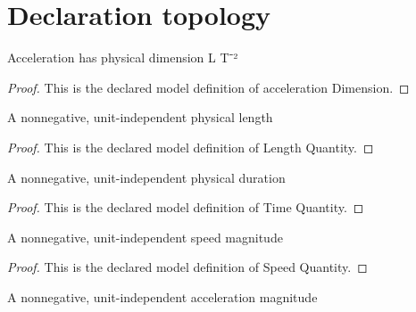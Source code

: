 \section{Declaration topology}
\begin{definition}
  \label{def:physics:phyx-mini-0684:phyxminiproblems-problemphyxmini0684-accelerationdimension}
  Acceleration has physical dimension L T⁻²
\end{definition}
\begin{proof}
  This is the declared model definition of acceleration Dimension.
\end{proof}
\begin{definition}
  \label{def:physics:phyx-mini-0684:phyxminiproblems-problemphyxmini0684-lengthquantity}
  A nonnegative, unit-independent physical length
\end{definition}
\begin{proof}
  This is the declared model definition of Length Quantity.
\end{proof}
\begin{definition}
  \label{def:physics:phyx-mini-0684:phyxminiproblems-problemphyxmini0684-timequantity}
  A nonnegative, unit-independent physical duration
\end{definition}
\begin{proof}
  This is the declared model definition of Time Quantity.
\end{proof}
\begin{definition}
  \label{def:physics:phyx-mini-0684:phyxminiproblems-problemphyxmini0684-speedquantity}
  A nonnegative, unit-independent speed magnitude
\end{definition}
\begin{proof}
  This is the declared model definition of Speed Quantity.
\end{proof}
\begin{definition}
  \label{def:physics:phyx-mini-0684:phyxminiproblems-problemphyxmini0684-accelerationquantity}
  A nonnegative, unit-independent acceleration magnitude
\end{definition}
